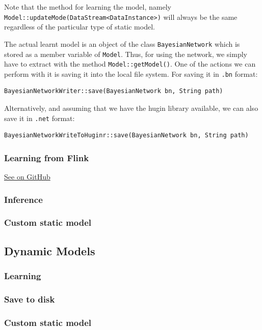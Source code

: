 \documentclass[10pt,a4paper]{article}
\begin{document}
\noindent Note that the method for learning the model, namely \texttt{Model::updateMode(DataStream<DataInstance>)} will always be the same regardless of the particular type of static model.\newline 

The actual learnt model is an object of the class \texttt{BayesianNetwork} which is stored as a member variable of \texttt{Model}. Thus, for using the network, we simply have to extract with the method \texttt{Model::getModel()}. One of the actions we can perform with it is saving it into the local file system. For saving it in \texttt{.bn} format:

\begin{verbatim}
BayesianNetworkWriter::save(BayesianNetwork bn, String path)
\end{verbatim}

\noindent Alternatively, and assuming that we have the hugin library available, we can also save it in \texttt{.net} format:

\begin{verbatim}
BayesianNetworkWriteToHuginr::save(BayesianNetwork bn, String path)
\end{verbatim}



\subsubsection{Learning from Flink}\label{sec:lvmodels:static:flinklearning}



\href{https://github.com/amidst/tutorial/blob/master/src/main/java/eu/amidst/tutorial/usingAmidst/examples/StaticModelFlink.java}{See on GitHub}
\vspace{3mm}




\subsubsection{Inference}\label{sec:lvmodels:static:inference}
\subsubsection{Custom static model}\label{sec:lvmodels:static:custom}




\subsection{Dynamic Models}\label{sec:lvmodels:dynamic}
\subsubsection{Learning}\label{sec:lvmodels:dynamic:learning}
\subsubsection{Save to disk}\label{sec:lvmodels:dynamic:save} %
\subsubsection{Custom static model}\label{sec:lvmodels:dynamic:custom}
\end{document}
